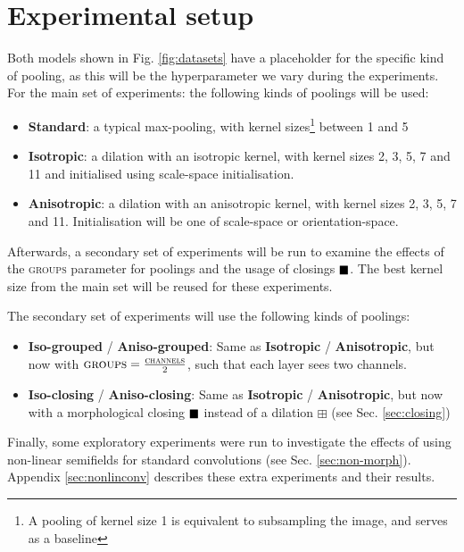 \documentclass[a4paper, 12pt]{report}
\DeclareMathOperator{\boxclose}{\vcenter{\hbox{$\blacksquare$}}}
\begin{document}
\newpage
\section{Experimental setup}
\label{sec:setup}
Both models shown in Fig. \ref{fig:datasets} have a placeholder for the specific kind of pooling, as this will be the hyperparameter we vary during the experiments.
For the main set of experiments: the following kinds of poolings will be used:
\begin{itemize}
\vspace{-0.1cm}
\setlength{\itemsep}{0pt}
	\item \textbf{Standard}: a typical max-pooling, with kernel sizes\footnote{A pooling of kernel size 1 is equivalent to subsampling the image, and serves as a baseline} between 1 and 5
	\item \textbf{Isotropic}: a dilation with an isotropic kernel, with kernel sizes 2, 3, 5, 7 and 11 and initialised using scale-space initialisation.
	\item \textbf{Anisotropic}: a dilation with an anisotropic kernel, with kernel sizes 2, 3, 5, 7 and 11. Initialisation will be one of scale-space or orientation-space.
\end{itemize}
\vspace{-0.1cm}
Afterwards, a secondary set of experiments will be run to examine the effects of the \textsc{groups} parameter for poolings and the usage of closings $\boxclose$. The best kernel size from the main set will be reused for these experiments.

The secondary set of experiments will use the following kinds of poolings:
\begin{itemize}
\vspace{-0.1cm}
\setlength{\itemsep}{0pt}
	\item \textbf{Iso-grouped} / \textbf{Aniso-grouped}: Same as \textbf{Isotropic} / \textbf{Anisotropic}, but now with $\textsc{groups}=\frac{\textsc{channels}}{2}$, such that each layer sees two channels.
	\item \textbf{Iso-closing} / \textbf{Aniso-closing}: Same as \textbf{Isotropic} / \textbf{Anisotropic}, but now with a morphological closing $\boxclose$ instead of a dilation $\boxplus$ (see Sec. \ref{sec:closing})
\end{itemize}
\vspace{-0.1cm}
Finally, some exploratory experiments were run to investigate the effects of using non-linear semifields for standard convolutions (see Sec. \ref{sec:non-morph}). Appendix \ref{sec:nonlinconv} describes these extra experiments and their results.
\end{document}
